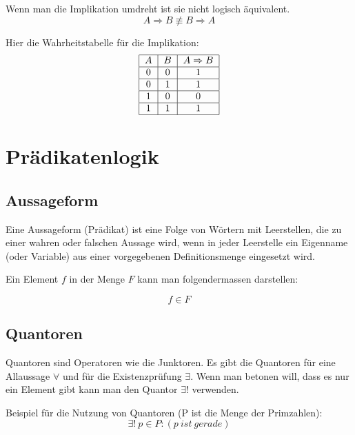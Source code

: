 \documentclass[12pt, a4paper, oneside]{article}
\begin{document}
Wenn man die Implikation umdreht ist sie nicht logisch äquivalent.
\begin{equation*}
  A \Rightarrow B \not\equiv B \Rightarrow A
\end{equation*}

Hier die Wahrheitstabelle für die Implikation:
\begin{equation*}
  \begin{tabular}{|c|c|c|}
    \hline
    $A$ & $B$ & $A \Rightarrow B$ \\ \hline
    0 & 0 & 1 \\ \hline
    0 & 1 & 1 \\ \hline
    1 & 0 & 0 \\ \hline
    1 & 1 & 1 \\ \hline
  \end{tabular}
\end{equation*}

\newpage
\section{Prädikatenlogik}
\subsection{Aussageform}
Eine Aussageform (Prädikat) ist eine Folge von Wörtern mit Leerstellen, die zu einer wahren oder falschen Aussage wird, wenn in jeder Leerstelle ein Eigenname (oder Variable) aus einer vorgegebenen Definitionsmenge eingesetzt wird.

Ein Element $f$ in der Menge $F$ kann man folgendermassen darstellen: 

\begin{equation*}
  f \in F
\end{equation*}

\subsection{Quantoren}
Quantoren sind Operatoren wie die Junktoren. Es gibt die Quantoren für eine Allaussage $\forall$ und für die Existenzprüfung $\exists$. Wenn man betonen will, dass es nur ein Element gibt kann man den Quantor $\exists!$ verwenden.

Beispiel für die Nutzung von Quantoren (P ist die Menge der Primzahlen):
\begin{equation*}
  \exists!\ p \in P : (p\ ist\ gerade)
\end{equation*}

\newpage
\end{document}

